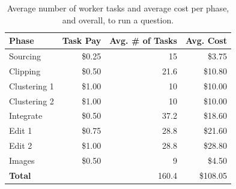 \begin{table}[ht]
  \centering
  \begin{tabular}{lrrr}
    \hline
    \textbf{Phase} & \textbf{Task Pay} & \textbf{Avg. \# of Tasks} & \textbf{Avg. Cost} \\
    \hline
	Sourcing & \$0.25 & 15 & \$3.75 \\

    Clipping & \$0.50 & 21.6 & \$10.80 \\

    Clustering 1 & \$1.00 & 10 & \$10.00 \\

    Clustering 2 & \$1.00 & 10 & \$10.00 \\

    Integrate & \$0.50 & 37.2 & \$18.60 \\

    Edit 1 & \$0.75 & 28.8 & \$21.60 \\

    Edit 2 & \$1.00 & 28.8 & \$28.80 \\

    Images & \$0.50 & 9 & \$4.50 \\
    \hline    
    \textbf{Total} & & 160.4 & \$108.05 \\
    \hline
  \end{tabular}
  \caption[Average number of worker tasks and cost of running KA.]{Average number of worker tasks and average cost per phase, and overall, to run a question.}
  \label{tab:cost}
\end{table}

